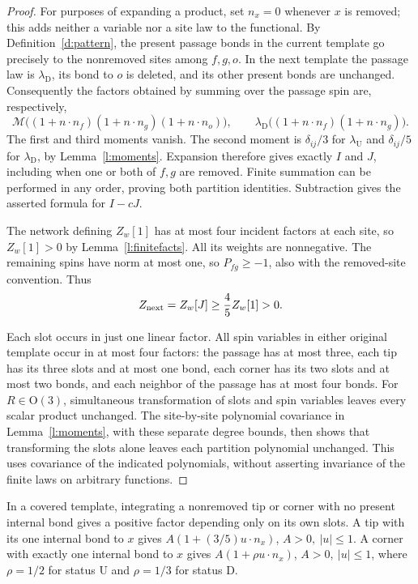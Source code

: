 \begin{proof}
For purposes of expanding a product, set \(n_x=0\) whenever \(x\)
is removed; this adds neither a variable nor a site law to the
functional.  By Definition~\ref{d:pattern}, the present passage
bonds in the current template go precisely to the nonremoved sites
among \(f,g,o\).  In the next template the passage law is
\(\lambda_{\mathrm D}\), its bond to \(o\) is deleted, and its
other present bonds are unchanged.  Consequently the factors
obtained by summing over the passage spin are, respectively,
\[
 \mathcal M\bigl((1+n\cdot n_f)(1+n\cdot n_g)
                         (1+n\cdot n_o)\bigr),\qquad
 \lambda_{\mathrm D}\bigl((1+n\cdot n_f)(1+n\cdot n_g)\bigr).
\]
The first and third moments vanish.  The second moment is
\(\delta_{ij}/3\) for \(\lambda_{\mathrm U}\) and
\(\delta_{ij}/5\) for \(\lambda_{\mathrm D}\), by
Lemma~\ref{l:moments}.  Expansion therefore gives exactly \(I\)
and \(J\), including when one or both of \(f,g\) are removed.
Finite summation can be performed in any order, proving both
partition identities.  Subtraction gives the asserted formula for
\(I-cJ\).

The network defining \(Z_w[1]\) has at most four incident factors
at each site, so \(Z_w[1]>0\) by Lemma~\ref{l:finitefacts}.
All its weights are nonnegative.  The remaining spins have norm
at most one, so \(P_{fg}\ge-1\), also with the removed-site
convention.  Thus
\[
 Z_{\rm next}=Z_w[J]\ge\frac45 Z_w[1]>0.
\]

Each slot occurs in just one linear factor.  All spin variables
in either original template occur in at most four factors:
the passage has at most three, each tip has its three slots and
at most one bond, each corner has its two slots and at most two
bonds, and each neighbor of the passage has at most four bonds.
For \(R\in\mathrm O(3)\), simultaneous transformation of slots
and spin variables leaves every scalar product unchanged.
The site-by-site polynomial covariance in
Lemma~\ref{l:moments}, with these separate degree bounds, then
shows that transforming the slots alone leaves each partition
polynomial unchanged.  This uses covariance of the indicated
polynomials, without asserting invariance of the finite laws on
arbitrary functions.
\end{proof}

\begin{lemma}\label{l:leaf}
In a covered template, integrating a nonremoved tip or corner
with no present internal bond gives a positive factor depending
only on its own slots.
A tip with its one internal bond to \(x\) gives
\(A(1+(3/5)u\cdot n_x)\), \(A>0,\ |u|\le1\).
A corner with exactly one internal bond to \(x\) gives
\(A(1+\rho u\cdot n_x)\), \(A>0,\ |u|\le1\), where
\(\rho=1/2\) for status \(\mathrm U\) and \(\rho=1/3\)
for status \(\mathrm D\).
\end{lemma}

